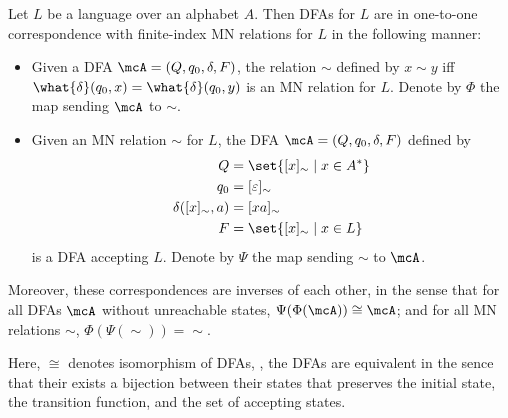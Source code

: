 \begin{proposition*} \label{thm:mn:correspondence}
    Let $L$ be a language over an alphabet $A$.
    Then DFAs for $L$ are in one-to-one correspondence with finite-index MN
    relations for $L$ in the following manner:
    \begin{itemize}
        \item Given a DFA $\mcA = (Q, q_0, \delta, F)$, the relation $\sim$
        defined by $x \sim y$ iff
        $\what{\delta}(q_0, x) = \what{\delta}(q_0, y)$ is an MN relation
        for $L$.
        Denote by $\Phi$ the map sending $\mcA$ to $\sim$.
        \item Given an MN relation $\sim$ for $L$, the DFA $\mcA = (Q, q_0,
        \delta, F)$ defined by \begin{align*}
            Q &= \set{[x]_{\sim} \mid x \in A^*} \\
            q_0 &= [\varepsilon]_{\sim} \\
            \delta([x]_{\sim}, a) &= [xa]_{\sim} \\
            F &= \set{[x]_{\sim} \mid x \in L}
        \end{align*} is a DFA accepting $L$.
        Denote by $\Psi$ the map sending $\sim$ to $\mcA$.
    \end{itemize}
    Moreover, these correspondences are inverses of each other, in the sense
    that for all DFAs $\mcA$ without unreachable states,
    $\Psi(\Phi(\mcA)) \cong \mcA$; and for all MN relations $\sim$,
    $\Phi(\Psi(\sim)) = {\sim}$.
\end{proposition*}
Here, $\cong$ denotes isomorphism of DFAs, \ie, the DFAs are equivalent
in the sence that their exists a bijection between their states that
preserves the initial state, the transition function, and the set of
accepting states.
